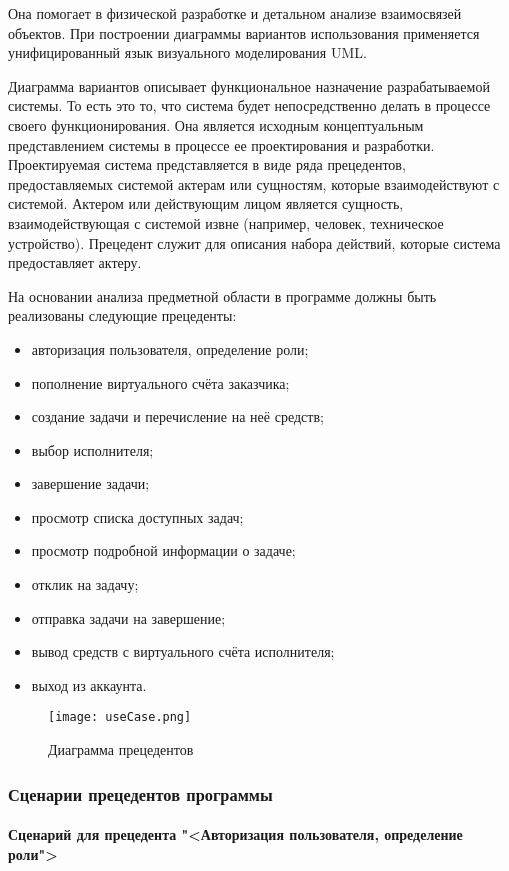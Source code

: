 Она помогает в физической разработке и детальном анализе взаимосвязей объектов. При построении диаграммы вариантов использования применяется унифицированный язык визуального моделирования UML.

Диаграмма вариантов описывает функциональное назначение разрабатываемой системы. То есть это то, что система будет непосредственно делать в процессе своего функционирования. Она является исходным концептуальным представлением системы в процессе ее проектирования и разработки. Проектируемая система представляется в виде ряда прецедентов, предоставляемых системой актерам или сущностям, которые взаимодействуют с системой. Актером или действующим лицом является сущность, взаимодействующая с системой извне (например, человек, техническое устройство). Прецедент служит для описания набора действий, которые система предоставляет актеру.

На основании анализа предметной области в программе должны быть реализованы следующие прецеденты:
\begin{itemize}
\item авторизация пользователя, определение роли;
\item пополнение виртуального счёта заказчика;
\item создание задачи и перечисление на неё средств;
\item выбор исполнителя;
\item завершение задачи;
\item просмотр списка доступных задач;
\item просмотр подробной информации о задаче;
\item отклик на задачу;
\item отправка задачи на завершение;
\item вывод средств с виртуального счёта исполнителя;
\item выход из аккаунта.
\end{itemize}
\clearpage

\begin{figure}[ht]
	\texttt{[image: useCase.png]}
	\caption{Диаграмма прецедентов}
	\label{ucUML:image}
\end{figure}

\subsubsection{Сценарии прецедентов программы}


\paragraph{Сценарий для прецедента "<Авторизация пользователя, определение роли">}

